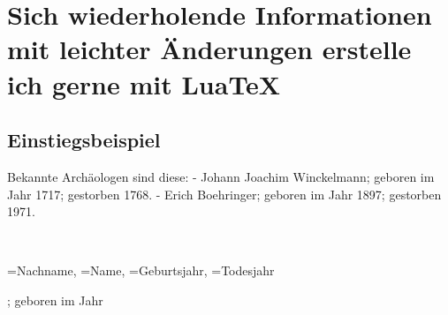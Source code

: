 
\chapter[Infos]{Sich wiederholende Informationen mit leichter Änderungen erstelle ich gerne mit LuaTeX}
\section{Einstiegsbeispiel}


Bekannte Archäologen sind diese:
- Johann Joachim Winckelmann; geboren im Jahr 1717; gestorben 1768.
- Erich Boehringer; geboren im Jahr 1897; gestorben 1971.

\pagebreak
{}%
\\

\begin{itemize}
{\nachname=Nachname,%
\name=Name,%
\geburtsjahr=Geburtsjahr,%
\todesjahr=Todesjahr%
}
{\item \name\xspace \nachname;
geboren im Jahr \geburtsjahr\ifdefempty{}
}
\end{itemize}



